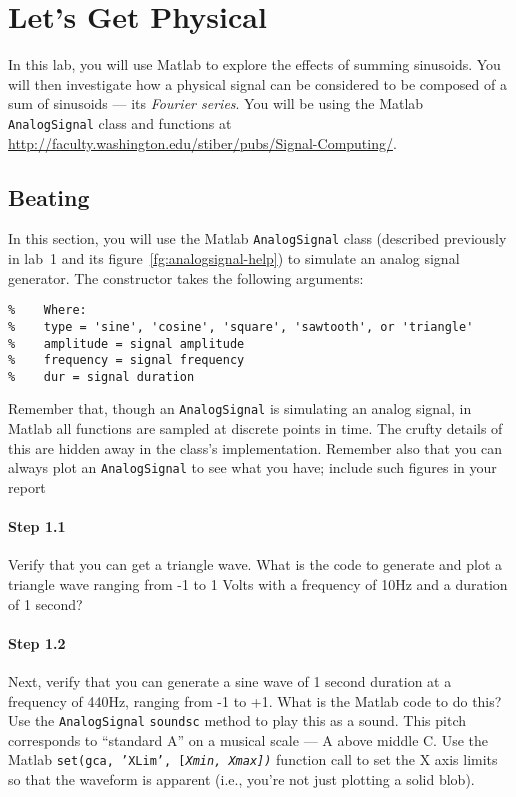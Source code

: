 
\section{Let's Get Physical}

In this lab, you will use Matlab to explore the effects of summing
sinusoids. You will then investigate how a physical signal can be
considered to be composed of a sum of sinusoids --- its \emph{Fourier
  series}. You will be using the Matlab \texttt{AnalogSignal} class
and functions at
\url{http://faculty.washington.edu/stiber/pubs/Signal-Computing/}.

\subsection{Beating}

In this section, you will use the Matlab \texttt{AnalogSignal} class
(described previously in lab~1 and its
figure~\ref{fg:analogsignal-help}) to simulate an analog signal
generator. The constructor takes the following arguments:
\begin{lstlisting}[style=Matlab-editor,basicstyle=\mlttfamily\small]
% AnalogSignal(type, amplitude, frequency, dur)
%    Where:
%    type = 'sine', 'cosine', 'square', 'sawtooth', or 'triangle'
%    amplitude = signal amplitude
%    frequency = signal frequency
%    dur = signal duration
\end{lstlisting}

Remember that, though an \texttt{AnalogSignal} is simulating an analog
signal, in Matlab all functions are sampled at discrete points in
time. The crufty details of this are hidden away in the class's
implementation. Remember also that you can always plot an
\texttt{AnalogSignal} to see what you have; include such figures in
your report 

\paragraph{Step 1.1} Verify that you can get a triangle wave. What is
the code to generate and plot a triangle wave ranging from -1 to 1
Volts with a frequency of 10Hz and a duration of 1 second?

\paragraph{Step 1.2} Next, verify that you can generate a sine wave of
1 second duration at a frequency of 440Hz, ranging from -1 to +1. What
is the Matlab code to do this? Use the \texttt{AnalogSignal}
\texttt{soundsc} method to play this as a sound. This pitch
corresponds to ``standard A'' on a musical scale --- A above middle
C. Use the Matlab \texttt{set(gca, 'XLim', [\itshape{Xmin},
  \itshape{Xmax}])} function call to set the X axis limits so that the
waveform is apparent (i.e., you're not just plotting a solid blob).

